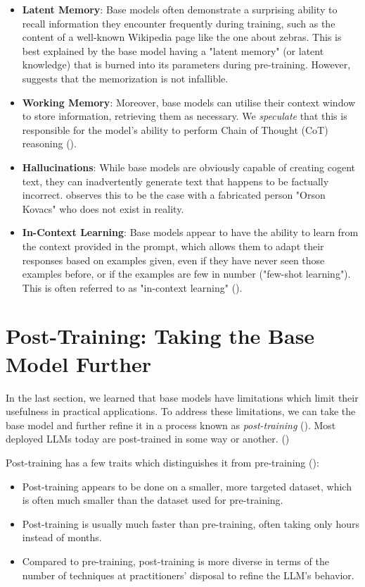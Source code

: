 \documentclass{article} %
\begin{document}
\begin{itemize}
    \item \textbf{Latent Memory}: Base models often demonstrate a surprising ability to recall information they encounter frequently during training,
        such as the content of a well-known Wikipedia page like the one about zebras.
        This is best explained by the base model having a "latent memory" (or latent knowledge) that is burned into its parameters during pre-training.
        However, \cite{Karpathy-2025} suggests that the memorization is not infallible.
    \item \textbf{Working Memory}: Moreover, base models can utilise their context window to store
        information, retrieving them as necessary. We \textit{speculate} that this 
        is responsible for the model's ability to perform Chain of Thought (CoT) reasoning (\cite{Wei-et-al-2023}).
    \item \textbf{Hallucinations}: While base models are obviously capable of creating cogent text,
        they can inadvertently generate text that happens to be factually incorrect.
        \cite{Karpathy-2025} observes this to be the case with a fabricated person "Orson Kovacs" who does not exist in reality.
    \item \textbf{In-Context Learning}: Base models appear to have the ability to learn from the context provided in the prompt,
        which allows them to adapt their responses based on examples given, even if they have never seen those examples before,
        or if the examples are few in number ("few-shot learning").
        This is often referred to as "in-context learning" (\cite{Brown-et-al-2020}).
\end{itemize}

\section{Post-Training: Taking the Base Model Further}
In the last section, we learned that base models have limitations which limit
their usefulness in practical applications.
To address these limitations, we can take the base model and further refine it in a process known as
\textit{post-training} (\cite{Karpathy-2025}).
Most deployed LLMs today are post-trained in some way or another. (\cite{Alibaba-2025,Anthropic-2025,ChatGPT-2022,Deepseek-2024,Google-2025})

Post-training has a few traits which distinguishes it from pre-training (\cite{Karpathy-2025}):
\begin{itemize}
    \item Post-training appears to be done on a smaller, more targeted dataset,
        which is often much smaller than the dataset used for pre-training.
    \item Post-training is usually much faster than pre-training, often taking only hours instead of months.
    \item Compared to pre-training, post-training is more diverse in terms of the 
        number of techniques at practitioners' disposal to refine the LLM's behavior.
\end{itemize}
\end{document}

